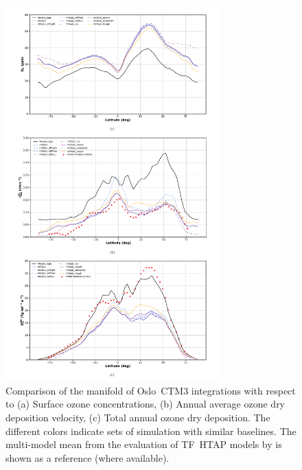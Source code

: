 \documentclass[gmd, manuscript]{copernicus}
\begin{document}
\begin{figure}[t]
  \includegraphics[width=8.3cm]{fig05}
  \caption{Comparison of the manifold of Oslo~CTM3 integrations with respect to (a) Surface ozone concentrations, (b) Annual average ozone dry deposition velocity, (c) Total annual ozone dry deposition. The different colors indicate sets of simulation with similar baselines. The multi-model mean from the evaluation of TF~HTAP models by \citet{ACP:Hardacre2015} is shown as a reference (where available).}
  \label{fig:mmm_drydep}
\end{figure}
%
\end{document}
